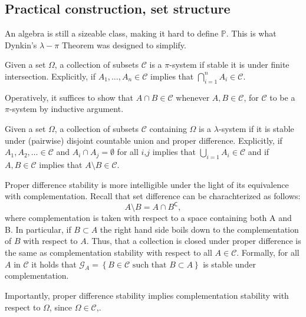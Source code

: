 \subsection{Practical construction, set structure}

An algebra is still a sizeable class, making it hard to define $\mathbb{P}$. This is what Dynkin’s $\lambda-\pi$ Theorem was designed to simplify.

\begin{my_definition}[$\pi$-system]
	Given a set $\Omega$, a collection of subsets $\mathcal{C}$ is a $\pi$-system if stable it is under finite intersection. Explicitly, if $A_1, \dots, A_n \in \mathcal{C}$ implies that $\bigcap^n_{i=1} A_i \in \mathcal{C}$.
\end{my_definition}
\begin{my_remark}
	Operatively, it suffices to show that $A \cap B \in \mathcal{C}$ whenever $A,B \in \mathcal{C}$, for $\mathcal{C}$ to be a $\pi$-system by inductive argument.
\end{my_remark}
\begin{my_definition}
	Given a set $\Omega$, a collection of subsets $\mathcal{C}$ containing $\Omega$ is a $\lambda$-system if it is stable under (pairwise) disjoint countable union and proper difference. Explicitly, if $A_1, A_2, \dots \in \mathcal{C}$ and $A_i \cap A_j = \emptyset$ for all $i$,$j$ implies that $\bigcup_{i=1} A_i \in \mathcal{C}$ and if $A,B \in \mathcal{C}$ implies that $A \setminus B \in \mathcal{C}$.
\end{my_definition}
\begin{my_remark}
	\label{proper_diff_stab}
	Proper difference stability is more intelligible under the light of its equivalence with complementation. Recall that set difference can be charachterized as follows:
	\[
		A \setminus B = A \cap B^\mathsf{C},
	\]
	where complementation is taken with respect to a space containing both A and B. In particular, if $B \subset A$ the right hand side boils down to the complementation of $B$ with respect to $A$. Thus, that a collection is closed under proper difference is the same as complementation stability with respect to all $A \in \mathcal{C}$. Formally, for all $A$ in $\mathcal{C}$ it holds that $\mathcal{G}_A=\left \{B \in \mathcal{C} \text{ such that } B \subset A \right \}$ is stable under complementation. 
	
	Importantly, proper difference stability implies complementation stability with respect to $\Omega$, since $\Omega \in \mathcal{C}$,.
\end{my_remark}
